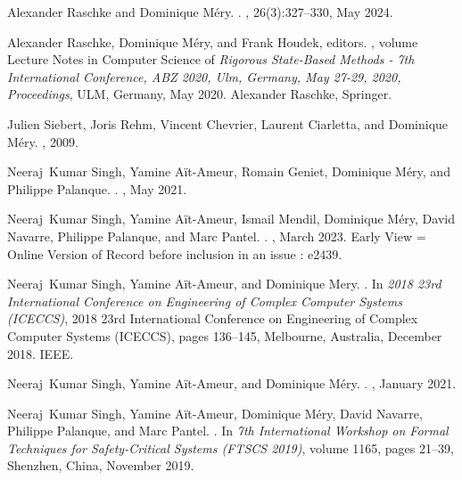 \documentclass[ 12pt]{article}
\begin{document}
\begin{thebibliography}{100}
Alexander Raschke and Dominique M{\'e}ry.
.
, 26(3):327--330, May 2024.

Alexander Raschke, Dominique M{\'e}ry, and Frank Houdek, editors.
, volume Lecture
  Notes in Computer Science of {\em Rigorous State-Based Methods - 7th
  International Conference, {ABZ} 2020, Ulm, Germany, May 27-29, 2020,
  Proceedings}, ULM, Germany, May 2020. {Alexander Raschke}, {Springer}.

Julien Siebert, Joris Rehm, Vincent Chevrier, Laurent Ciarletta, and Dominique
  M{\'e}ry.
, 2009.

Neeraj~Kumar Singh, Yamine A{\"i}t-Ameur, Romain Geniet, Dominique M{\'e}ry,
  and Philippe Palanque.
.
, May 2021.

Neeraj~Kumar Singh, Yamine A{\"i}t-Ameur, Ismail Mendil, Dominique M{\'e}ry,
  David Navarre, Philippe Palanque, and Marc Pantel.
.
, March 2023.
\newblock Early View = Online Version of Record before inclusion in an issue :
  e2439.

Neeraj~Kumar Singh, Yamine A{\"i}t-Ameur, and Dominique Mery.
.
\newblock In {\em {2018 23rd International Conference on Engineering of Complex
  Computer Systems (ICECCS)}}, 2018 23rd International Conference on
  Engineering of Complex Computer Systems (ICECCS), pages 136--145, Melbourne,
  Australia, December 2018. {IEEE}.

Neeraj~Kumar Singh, Yamine A{\"i}t-Ameur, and Dominique M{\'e}ry.
.
, January 2021.

Neeraj~Kumar Singh, Yamine A{\"i}t-Ameur, Dominique M{\'e}ry, David Navarre,
  Philippe Palanque, and Marc Pantel.
.
\newblock In {\em {7th International Workshop on Formal Techniques for
  Safety-Critical Systems (FTSCS 2019)}}, volume 1165, pages 21--39, Shenzhen,
  China, November 2019.


\end{thebibliography}
\end{document}
